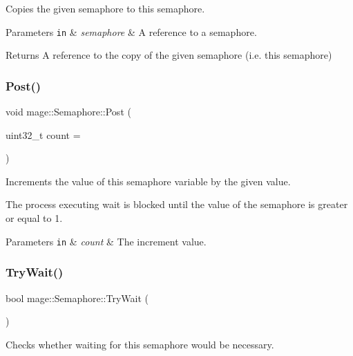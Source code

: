 Copies the given semaphore to this semaphore.


\begin{DoxyParams}[1]{Parameters}
\mbox{\tt in}  & {\em semaphore} & A reference to a semaphore. \\
\hline
\end{DoxyParams}
\begin{DoxyReturn}{Returns}
A reference to the copy of the given semaphore (i.\+e. this semaphore) 
\end{DoxyReturn}
\hypertarget{classmage_1_1_semaphore_a354ea9743f9794b14a3f032e0443b214}{}\label{classmage_1_1_semaphore_a354ea9743f9794b14a3f032e0443b214} 
\subsubsection{\texorpdfstring{Post()}{Post()}}
{\footnotesize\ttfamily void mage\+::\+Semaphore\+::\+Post (\begin{DoxyParamCaption}\item[{uint32\+\_\+t}]{count = {} }\end{DoxyParamCaption})}

Increments the value of this semaphore variable by the given value.

The process executing wait is blocked until the value of the semaphore is greater or equal to 1.


\begin{DoxyParams}[1]{Parameters}
\mbox{\tt in}  & {\em count} & The increment value. \\
\hline
\end{DoxyParams}
\hypertarget{classmage_1_1_semaphore_ab34cdf4e9b7388dbdb30aab167c074f6}{}\label{classmage_1_1_semaphore_ab34cdf4e9b7388dbdb30aab167c074f6} 
\subsubsection{\texorpdfstring{Try\+Wait()}{TryWait()}}
{\footnotesize\ttfamily bool mage\+::\+Semaphore\+::\+Try\+Wait (\begin{DoxyParamCaption}{ }\end{DoxyParamCaption})}

Checks whether waiting for this semaphore would be necessary.

